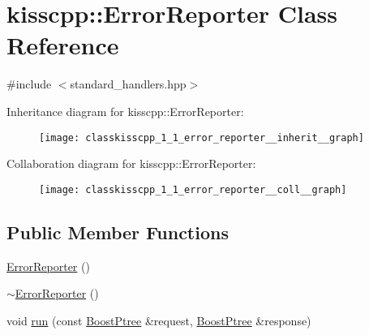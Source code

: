 \hypertarget{classkisscpp_1_1_error_reporter}{\section{kisscpp\-:\-:Error\-Reporter Class Reference}
\label{classkisscpp_1_1_error_reporter}
}


{\ttfamily \#include $<$standard\-\_\-handlers.\-hpp$>$}



Inheritance diagram for kisscpp\-:\-:Error\-Reporter\-:\nopagebreak
\begin{figure}[H]
\begin{center}
\leavevmode
\texttt{[image: classkisscpp\_1\_1\_error\_reporter\_\_inherit\_\_graph]}
\end{center}
\end{figure}


Collaboration diagram for kisscpp\-:\-:Error\-Reporter\-:\nopagebreak
\begin{figure}[H]
\begin{center}
\leavevmode
\texttt{[image: classkisscpp\_1\_1\_error\_reporter\_\_coll\_\_graph]}
\end{center}
\end{figure}
\subsection*{Public Member Functions}
\begin{DoxyCompactItemize}
\item 
\hyperlink{classkisscpp_1_1_error_reporter_ae772ce0549cded2acb8909b420c4b6d7}{Error\-Reporter} ()
\item 
\hyperlink{classkisscpp_1_1_error_reporter_a497e32bd73503b28283b3e64fd0ac45c}{$\sim$\-Error\-Reporter} ()
\item 
void \hyperlink{classkisscpp_1_1_error_reporter_a7afc458c0a447f93f138f006acb57117}{run} (const \hyperlink{boost__ptree_8hpp_ab36820650b8e0db36402aea80485633c}{Boost\-Ptree} \&request, \hyperlink{boost__ptree_8hpp_ab36820650b8e0db36402aea80485633c}{Boost\-Ptree} \&response)
\end{DoxyCompactItemize}


